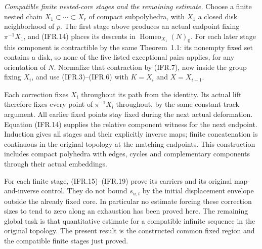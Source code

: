 \documentclass[11pt,a4paper]{article}
\begin{document}
\emph{Compatible finite nested-core stages and the remaining estimate.}
Choose a finite nested chain $X_1\subset\cdots\subset X_r$ of
compact subpolyhedra, with $X_1$ a closed disk neighborhood of $p$.
The first stage above produces an actual endpoint fixing
$\pi^{-1}X_1$, and (IFR.14) places its descents in
$\operatorname{Homeo}_{X_1}(N)_0$.
For each later stage this component is contractible by the same
Theorem~1.1: its nonempty fixed set contains a disk, so none of the
five listed exceptional pairs applies, for any orientation of $N$.
Normalize that contraction by (IFR.7), now inside the group fixing
$X_i$, and use (IFR.3)--(IFR.6) with $K=X_i$ and $X=X_{i+1}$.

Each correction fixes $X_i$ throughout its path from the identity.
Its actual lift therefore fixes every point of $\pi^{-1}X_i$
throughout, by the same constant-track argument. All earlier fixed
points stay fixed during the next actual deformation. Equation
(IFR.14) supplies the relative component witness for the next endpoint.
Induction gives all stages and their explicitly inverse maps; finite
concatenation is continuous in the original topology at the matching
endpoints. This construction includes compact polyhedra with edges,
cycles and complementary components through their actual embeddings.

For each finite stage, (IFR.15)--(IFR.19) prove its carriers and its
original map-and-inverse control. They do not bound $s_{u,t}$ by the
initial displacement envelope outside the already fixed core.
In particular no estimate forcing these correction sizes to tend to
zero along an exhaustion has been proved here. The remaining global
task is that quantitative estimate for a compatible infinite sequence
in the original topology. The present result is the constructed
common fixed region and the compatible finite stages just proved.



\end{document}
